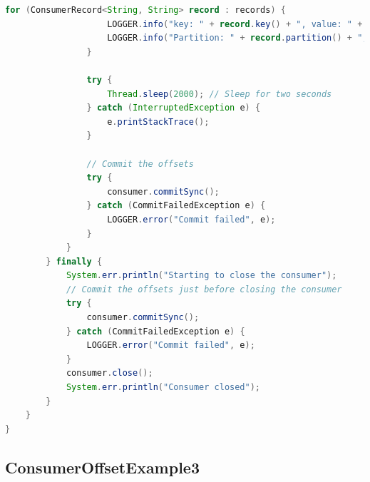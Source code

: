 \documentclass[a4paper,10pt,twoside]{report}
\begin{document}
\begin{lstlisting}[language=Java]
				for (ConsumerRecord<String, String> record : records) {
					LOGGER.info("key: " + record.key() + ", value: " + record.value());
					LOGGER.info("Partition: " + record.partition() + ", Offset:" + record.offset());
				}
				
				try {
					Thread.sleep(2000); // Sleep for two seconds 
				} catch (InterruptedException e) {
					e.printStackTrace();
				}
				
				// Commit the offsets
				try {
					consumer.commitSync();
				} catch (CommitFailedException e) {
					LOGGER.error("Commit failed", e);	
				}
			}
		} finally {
			System.err.println("Starting to close the consumer");
			// Commit the offsets just before closing the consumer
			try {
				consumer.commitSync();
			} catch (CommitFailedException e) {
				LOGGER.error("Commit failed", e);	
			}
			consumer.close();
			System.err.println("Consumer closed");
		}	
	}	
}
\end{lstlisting}

\subsection{ConsumerOffsetExample3}
\end{document}
